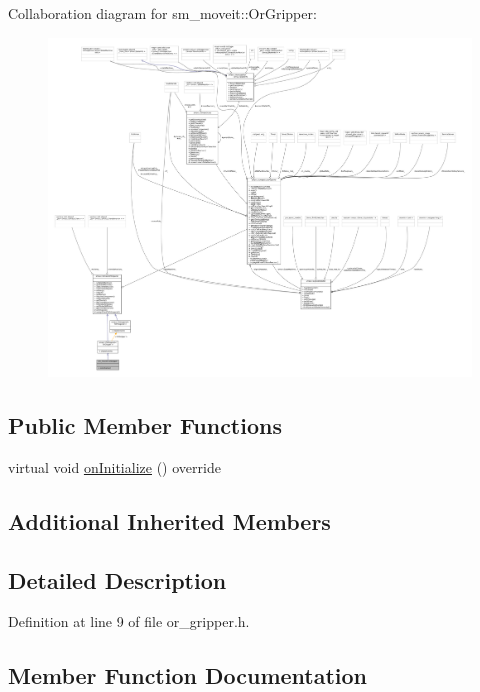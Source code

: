 Collaboration diagram for sm\+\_\+moveit\+:\+:Or\+Gripper\+:
\nopagebreak
\begin{figure}[H]
\begin{center}
\leavevmode
\includegraphics[width=350pt]{classsm__moveit_1_1OrGripper__coll__graph}
\end{center}
\end{figure}
\subsection*{Public Member Functions}
\begin{DoxyCompactItemize}
\item 
virtual void \hyperlink{classsm__moveit_1_1OrGripper_a845a54a1d4469b8aee57c33c49312c86}{on\+Initialize} () override
\end{DoxyCompactItemize}
\subsection*{Additional Inherited Members}


\subsection{Detailed Description}


Definition at line 9 of file or\+\_\+gripper.\+h.



\subsection{Member Function Documentation}
\mbox{\label{classsm__moveit_1_1OrGripper_a845a54a1d4469b8aee57c33c49312c86}} 
